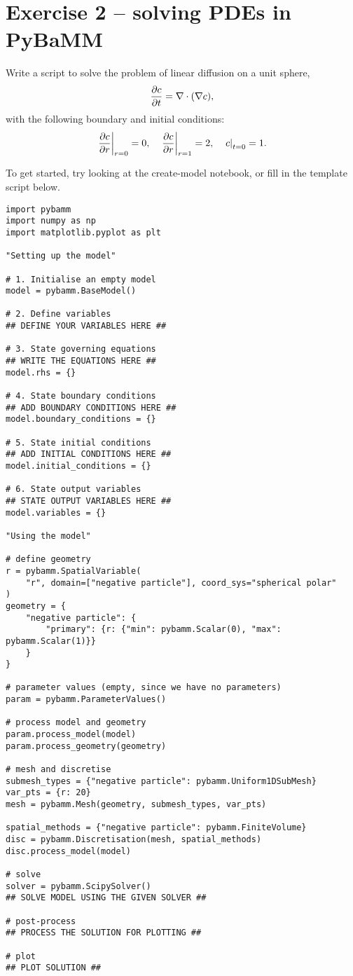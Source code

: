 \documentclass[a4paper,11pt]{article}
\begin{document}
\pagebreak
\section*{Exercise 2 -- solving PDEs in PyBaMM}
Write a script to solve the problem of linear diffusion on a unit sphere,
\begin{equation*}
  \pdv{c}{t} = \nabla \cdot (\nabla c),
\end{equation*}
with the following boundary and initial conditions:
\begin{equation*}
  \left.\pdv{c}{r}\right\vert_{r=0} = 0, \quad \left.\pdv{c}{r}\right\vert_{r=1} = 2, \quad \left.c\right\vert_{t=0} = 1.
\end{equation*}

To get started, try looking at the create-model notebook, or fill in the template script below.

\begin{lstlisting}[label={Ex2},caption=Solving PDEs script]
import pybamm
import numpy as np
import matplotlib.pyplot as plt

"Setting up the model"

# 1. Initialise an empty model
model = pybamm.BaseModel()

# 2. Define variables
## DEFINE YOUR VARIABLES HERE ##

# 3. State governing equations
## WRITE THE EQUATIONS HERE ##
model.rhs = {}

# 4. State boundary conditions
## ADD BOUNDARY CONDITIONS HERE ##
model.boundary_conditions = {}

# 5. State initial conditions
## ADD INITIAL CONDITIONS HERE ##
model.initial_conditions = {}

# 6. State output variables
## STATE OUTPUT VARIABLES HERE ##
model.variables = {}

"Using the model"

# define geometry
r = pybamm.SpatialVariable(
    "r", domain=["negative particle"], coord_sys="spherical polar"
)
geometry = {
    "negative particle": {
        "primary": {r: {"min": pybamm.Scalar(0), "max": pybamm.Scalar(1)}}
    }
}

# parameter values (empty, since we have no parameters)
param = pybamm.ParameterValues()

# process model and geometry
param.process_model(model)
param.process_geometry(geometry)

# mesh and discretise
submesh_types = {"negative particle": pybamm.Uniform1DSubMesh}
var_pts = {r: 20}
mesh = pybamm.Mesh(geometry, submesh_types, var_pts)

spatial_methods = {"negative particle": pybamm.FiniteVolume}
disc = pybamm.Discretisation(mesh, spatial_methods)
disc.process_model(model)

# solve
solver = pybamm.ScipySolver()
## SOLVE MODEL USING THE GIVEN SOLVER ##

# post-process
## PROCESS THE SOLUTION FOR PLOTTING ##

# plot
## PLOT SOLUTION ##
\end{lstlisting}
\end{document}
